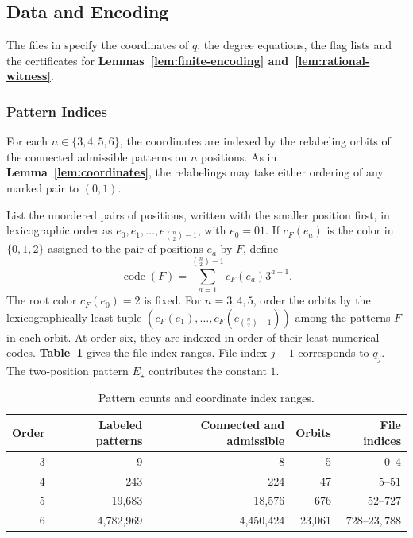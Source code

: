 \subsection{Data and Encoding}\label{app:data-specification}

The files in  specify the coordinates of
$q$, the degree equations, the flag lists and the certificates for
\textbf{Lemmas~\ref{lem:finite-encoding} and~\ref{lem:rational-witness}}.

\subsubsection{Pattern Indices}\label{app:pattern-indices}

For each $n\in\{3,4,5,6\}$, the coordinates are indexed by the
relabeling orbits of the connected admissible patterns on $n$ positions.
As in \textbf{Lemma~\ref{lem:coordinates}}, the relabelings may take
either ordering of any marked pair to $(0,1)$.

List the unordered pairs of positions, written with the smaller
position first, in lexicographic order as
$e_0,e_1,\ldots,e_{\binom{n}{2}-1}$, with $e_0=01$. If $c_F(e_a)$ is
the color in $\{0,1,2\}$ assigned to the pair of positions $e_a$ by $F$, define
\begin{equation}\label{eq:pattern-code}
 \operatorname{code}(F)=\sum_{a=1}^{\binom{n}{2}-1}c_F(e_a)3^{a-1}.
\end{equation}
The root color $c_F(e_0)=2$ is fixed. For $n=3,4,5$, order the orbits by the lexicographically least tuple
$(c_F(e_1),\ldots,c_F(e_{\binom n2-1}))$ among the patterns $F$ in
each orbit. At order six, they are indexed in order of their least numerical
codes. \textbf{Table~\ref{tab:coordinates}} gives the file index ranges.
File index $j-1$ corresponds to $q_j$. The two-position pattern
$E_\star$ contributes the constant $1$.

\begin{table}[htbp]
\centering
\caption{Pattern counts and coordinate index ranges.}
\label{tab:coordinates}
\begin{tabular}{@{}rrrrr@{}}
\toprule
Order & Labeled patterns & Connected and admissible & Orbits & File indices\\
\midrule
3 & 9 & 8 & 5 & $0$--$4$\\
4 & 243 & 224 & 47 & $5$--$51$\\
5 & 19,683 & 18,576 & 676 & $52$--$727$\\
6 & 4,782,969 & 4,450,424 & 23,061 & $728$--$23,788$\\
\bottomrule
\end{tabular}
\end{table}

